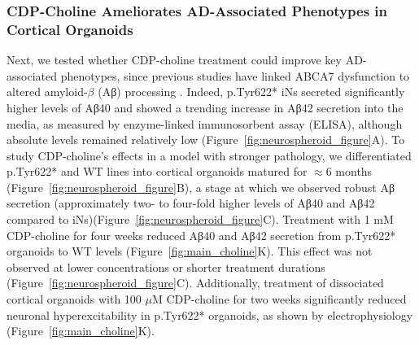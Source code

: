 \documentclass[12pt]{article}
\begin{document}
\subsubsection{CDP-Choline Ameliorates AD-Associated Phenotypes in Cortical Organoids}
Next, we tested whether CDP-choline treatment could improve key AD-associated phenotypes, since previous studies have linked ABCA7 dysfunction to altered amyloid-$\beta$ (Aβ) processing \cite{Satoh2015-yu,Sakae2016-uy,Bamji-Mirza2018-xt,Chan2008-qu,De_Roeck2018-fw}. Indeed, p.Tyr622* iNs secreted significantly higher levels of Aβ40 and showed a trending increase in Aβ42 secretion into the media, as measured by enzyme-linked immunosorbent assay (ELISA), although absolute levels remained relatively low (Figure~\ref{fig:neurospheroid_figure}A). To study CDP-choline's effects in a model with stronger pathology, we differentiated p.Tyr622* and WT lines into cortical organoids matured for $\approx 6$ months (Figure~\ref{fig:neurospheroid_figure}B), a stage at which we observed robust Aβ secretion (approximately two- to four-fold higher levels of Aβ40 and Aβ42 compared to iNs)(Figure~\ref{fig:neurospheroid_figure}C). Treatment with 1 mM CDP-choline for four weeks reduced Aβ40 and Aβ42 secretion from p.Tyr622* organoids to WT levels (Figure~\ref{fig:main_choline}K). This effect was not observed at lower concentrations or shorter treatment durations (Figure~\ref{fig:neurospheroid_figure}C). Additionally, treatment of dissociated cortical organoids with 100 $\mu$M CDP-choline for two weeks significantly reduced neuronal hyperexcitability in p.Tyr622* organoids, as shown by electrophysiology (Figure~\ref{fig:main_choline}K).

%
 
\end{document}

